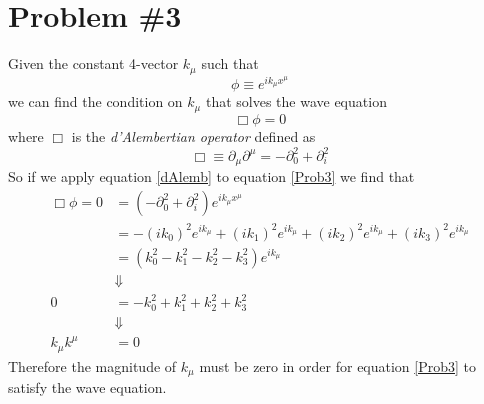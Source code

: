 \documentclass[11pt]{article}
\numberwithin{equation}{section}
\begin{document}
\section{Problem \#3}
    Given the constant 4-vector $k_{\mu}$ such that
    \begin{equation}
        \phi\equiv e^{ik_{\mu}x^{\mu}}
        \label{Prob3}
    \end{equation}
    we can find the condition on $k_{\mu}$ that solves the wave equation
    $$\Box\phi=0$$
    where $\Box$ is the \emph{d'Alembertian operator} defined as
    \begin{equation}
        \Box\equiv\partial_{\mu}\partial^{\mu} = -\partial_{0}^{2} + \partial_{i}^{2}
        \label{dAlemb}
    \end{equation}
    So if we apply equation \ref{dAlemb} to equation \ref{Prob3} we find that
    \begin{align*}
        \Box\phi = 0 &= (-\partial_{0}^{2} + \partial_{i}^{2})e^{ik_{\mu}x^{\mu}}\\
                     &= -(ik_0)^2e^{ik_{\mu}} + (ik_1)^2e^{ik_{\mu}}+ (ik_2)^2e^{ik_{\mu}}+ (ik_3)^2e^{ik_{\mu}}\\
                     &= (k_0^2 - k_1^2  - k_2^2 - k_3^2)e^{ik_{\mu}}\\
                     &\Downarrow\\
                   0 &= -k_0^2 + k_1^2  + k_2^2 + k_3^2 \\
                     &\Downarrow\\
        k_{\mu}k^{\mu} &= 0
    \end{align*}
    Therefore the magnitude of $k_{\mu}$ must be zero in order for equation \ref{Prob3} to satisfy the wave equation.

\pagebreak
\end{document}
